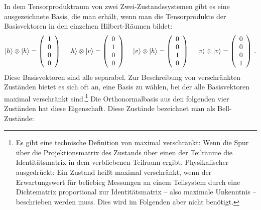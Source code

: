 In dem Tensorproduktraum von zwei Zwei-Zustandssystemen gibt es eine ausgezeichnete Basis, die man erh\"alt,
wenn man die Tensorprodukte der Basisvektoren in den einzelnen Hilbert-R\"aumen bildet:
\begin{equation}
           |h\rangle \otimes |h\rangle = \left( \begin{array}{c}  1 \\ 0 \\ 0 \\ 0 \end{array} \right) \hspace{0.4cm}
           |h\rangle \otimes |v\rangle = \left( \begin{array}{c}  0 \\ 1 \\ 0 \\ 0 \end{array} \right) \hspace{0.4cm}
           |v\rangle \otimes |h\rangle = \left( \begin{array}{c}  0 \\ 0 \\ 1 \\ 0 \end{array} \right) \hspace{0.4cm}
           |v\rangle \otimes |v\rangle = \left( \begin{array}{c}  0 \\ 0 \\ 0 \\ 1 \end{array} \right) \, .
\end{equation}
Diese Basisvektoren sind alle separabel. Zur Beschreibung von verschr\"ankten Zust\"anden bietet es sich
oft an, eine Basis zu w\"ahlen, bei der alle Basisvektoren maximal verschr\"ankt sind.\footnote{Es gibt eine
technische Definition von maximal verschr\"ankt: Wenn die Spur \"uber die Projektionsmatrix des Zustands 
\"uber einen der Teilr\"aume die Identit\"atsmatrix in dem verbliebenen Teilraum ergibt. Physikalischer
ausgedr\"uckt: Ein Zustand hei\ss t maximal verschr\"ankt, wenn der Erwartungswert f\"ur beliebieg 
Messungen an einem Teilsystem durch eine Dichtematrix proportional zur Identit\"atsmatrix -- also maximale
Unkenntnis -- beschrieben werden muss. Dies wird im Folgenden
aber nicht ben\"otigt.} Die Orthonormalbasis aus den folgenden vier Zust\"anden hat diese Eigenschaft.
Diese Zust\"ande bezeichnet man als Bell-Zust\"ande:

